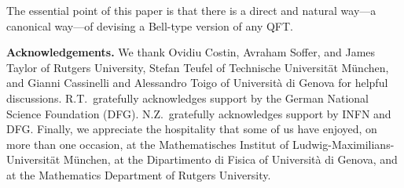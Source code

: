 \documentclass[12pt]{article}
\newcommand{\1}{\mathbf{1}} %
\begin{document}
The essential point of this paper is that there is a direct and
natural way---a canonical way---of devising a Bell-type version of any
QFT.

\bigskip

\noindent \textbf{Acknowledgements. }We thank Ovidiu Costin, Avraham
Soffer, and James Taylor of Rutgers University, Stefan
Teufel of Technische Universit\"at M\"unchen, and Gianni Cassinelli
and Alessandro Toigo of Universit\`a di Genova for helpful
discussions.  R.T.\ gratefully acknowledges support by the German
National Science Foundation (DFG).  N.Z.\ gratefully acknowledges
support by INFN and DFG.  Finally, we appreciate the hospitality that
some of us have enjoyed, on more than one occasion, at the
Mathematisches Institut of Ludwig-Maximilians-Universit\"at M\"unchen,
at the Dipartimento di Fisica of Universit\`a di Genova, and at the
Mathematics Department of Rutgers University.
\end{document}
